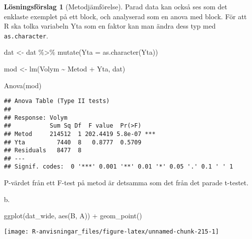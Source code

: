\documentclass[
]{book}
\newenvironment{Shaded}{\begin{snugshade}}{\end{snugshade}}
\newcommand{\AttributeTok}[1]{\textcolor[rgb]{0.77,0.63,0.00}{#1}}
\newcommand{\FunctionTok}[1]{\textcolor[rgb]{0.00,0.00,0.00}{#1}}
\newcommand{\NormalTok}[1]{#1}
\newcommand{\OtherTok}[1]{\textcolor[rgb]{0.56,0.35,0.01}{#1}}
\newcommand{\SpecialCharTok}[1]{\textcolor[rgb]{0.00,0.00,0.00}{#1}}
\theoremstyle{definition}
\theoremstyle{definition}
\theoremstyle{definition}
\theoremstyle{definition}
\newtheorem{hypothesis}{Lösningsförslag}[chapter]
\theoremstyle{remark}
\begin{document}
\begin{hypothesis}[Metodjämförelse]
Parad data kan också ses som det enklaste exemplet på ett block, och analyserad som en anova med block. För att R ska tolka variabeln Yta som en faktor kan man ändra dess typ med \texttt{as.character}.

\begin{Shaded}
\begin{Highlighting}[]
\NormalTok{dat }\OtherTok{\textless{}{-}}\NormalTok{ dat }\SpecialCharTok{\%\textgreater{}\%} \FunctionTok{mutate}\NormalTok{(}\AttributeTok{Yta =} \FunctionTok{as.character}\NormalTok{(Yta))}

\NormalTok{mod }\OtherTok{\textless{}{-}} \FunctionTok{lm}\NormalTok{(Volym }\SpecialCharTok{\textasciitilde{}}\NormalTok{ Metod }\SpecialCharTok{+}\NormalTok{ Yta, dat)}

\FunctionTok{Anova}\NormalTok{(mod)}
\end{Highlighting}
\end{Shaded}

\begin{verbatim}
## Anova Table (Type II tests)
## 
## Response: Volym
##           Sum Sq Df  F value  Pr(>F)    
## Metod     214512  1 202.4419 5.8e-07 ***
## Yta         7440  8   0.8777  0.5709    
## Residuals   8477  8                     
## ---
## Signif. codes:  0 '***' 0.001 '**' 0.01 '*' 0.05 '.' 0.1 ' ' 1
\end{verbatim}

P-värdet från ett F-test på metod är detsamma som det från det parade t-testet.

b.

\begin{Shaded}
\begin{Highlighting}[]
\FunctionTok{ggplot}\NormalTok{(dat\_wide, }\FunctionTok{aes}\NormalTok{(B, A)) }\SpecialCharTok{+} 
  \FunctionTok{geom\_point}\NormalTok{()}
\end{Highlighting}
\end{Shaded}

\begin{center}\texttt{[image: R-anvisningar\_files/figure-latex/unnamed-chunk-215-1]} \end{center}

\begin{Shaded}
\end{Shaded}


\end{hypothesis}
\end{document}
